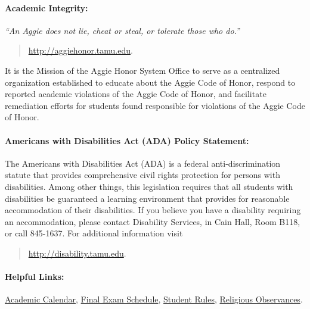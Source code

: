 \documentclass{article}
\begin{document}
% 
\paragraph{Academic Integrity:}
\emph{``An Aggie does not lie, cheat or steal, or tolerate those who do.''}
\begin{quote}
\url{http://aggiehonor.tamu.edu}.
\end{quote}
It is the Mission of the Aggie Honor System Office to serve as a centralized organization established to educate about the Aggie Code of Honor, respond to reported academic violations of the Aggie Code of Honor, and facilitate remediation efforts for students found responsible for violations of the Aggie Code of Honor.


%
\paragraph{Americans with Disabilities Act (ADA) Policy Statement:}
The Americans with Disabilities Act (ADA) is a federal anti-discrimination statute that provides comprehensive civil rights protection for persons with disabilities.
Among other things, this legislation requires that all students with disabilities be guaranteed a learning environment that provides for reasonable accommodation of their disabilities.
If you believe you have a disability requiring an accommodation, please contact Disability Services, in Cain Hall, Room B118, or call 845-1637.
For additional information visit
\begin{quote}
\url{http://disability.tamu.edu}.
\end{quote}


% 
\paragraph{Helpful Links:}
\href{http://registrar.tamu.edu/General/Calendar.aspx}{Academic Calendar},
\href{http://registrar.tamu.edu/General/FinalSchedule.aspx}{Final Exam Schedule},
\href{http://student-rules.tamu.edu/}{Student Rules},
\href{http://dof.tamu.edu/content/religious-observance}{Religious Observances}.
\end{document}
